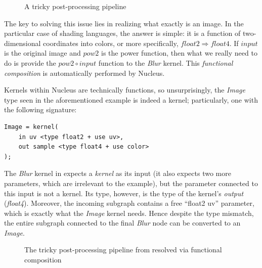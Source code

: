 \begin{figure}[ht!]
  \centering
    \caption[A tricky post-processing pipeline]{A tricky post-processing pipeline}
  \label{fig:TrickyPostProc}
\end{figure}

The key to solving this issue lies in realizing what exactly is an image. In the particular case of shading languages, the answer is simple: it is a function of two-dimensional coordinates into colors, or more specifically, $float2 \Rightarrow float4$. If $input$ is the original image and $pow2$ is the power function, then what we really need to do is provide the $pow2 \circ input$ function to the \emph{Blur} kernel. This \emph{functional composition} is automatically performed by Nucleus.

Kernels within Nucleus are technically functions, so unsurprisingly, the \emph{Image} type seen in the aforementioned example is indeed a kernel; particularly, one with the following signature:
	
\noindent\begin{minipage}{\textwidth}
\begin{lstlisting}[frame=single]
Image = kernel(
    in uv <type float2 + use uv>,
    out sample <type float4 + use color>
);
\end{lstlisting}
\end{minipage}

The \emph{Blur} kernel in  expects a \emph{kernel} as its input (it also expects two more parameters, which are irrelevant to the example), but the parameter connected to this input is not a kernel. Its type, however, is the type of the kernel's \emph{output} (\emph{float4}). Moreover, the incoming subgraph contains a free ``float2 uv'' parameter, which is exactly what the \emph{Image} kernel needs. Hence despite the type mismatch, the entire subgraph connected to the final \emph{Blur} node can be converted to an \emph{Image}.

\begin{figure}[ht!]
  \centering
    \caption[The tricky post-processing pipeline resolved]{The tricky post-processing pipeline from  resolved via functional composition}
  \label{fig:TrickyPostProcResolve}
\end{figure}

